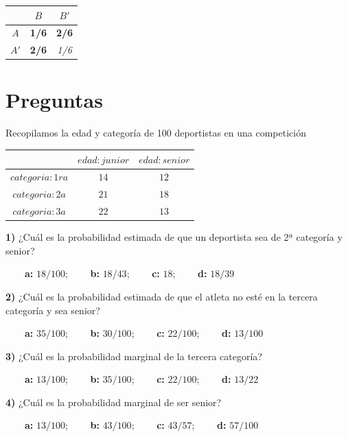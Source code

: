 \documentclass[
]{book}
\begin{document}
\begin{longtable}[]{@{}ccc@{}}
\toprule\noalign{}
& \(B\) & \(B'\) \\
\midrule\noalign{}
\endhead
\bottomrule\noalign{}
\endlastfoot
\(A\) & \textbf{1/6} & \textbf{2/6} \\
\(A'\) & \textbf{2/6} & \emph{1/6} \\
\end{longtable}

\hypertarget{preguntas-1}{%
\section{Preguntas}\label{preguntas-1}}

Recopilamos la edad y categoría de 100 deportistas en una competición

\begin{longtable}[]{@{}ccc@{}}
\toprule\noalign{}
& \(edad:junior\) & \(edad:senior\) \\
\midrule\noalign{}
\endhead
\bottomrule\noalign{}
\endlastfoot
\(categoria:1ra\) & \(14\) & \(12\) \\
\(categoria:2a\) & \(21\) & \(18\) \\
\(categoria:3a\) & \(22\) & \(13\) \\
\end{longtable}

\textbf{1)} ¿Cuál es la probabilidad estimada de que un deportista sea de 2ª categoría y senior?

\textbf{\(\qquad\)a:} \(18/100\); \textbf{\(\qquad\)b:} \(18/43\); \textbf{\(\qquad\)c:} \(18\); \textbf{\(\qquad\)d:} \(18/39\)

\textbf{2)} ¿Cuál es la probabilidad estimada de que el atleta no esté en la tercera categoría y sea senior?

\textbf{\(\qquad\)a:} \(35/100\); \textbf{\(\qquad\)b:} \(30/100\); \textbf{\(\qquad\)c:} \(22/100\); \textbf{\(\qquad\)d:} \(13/100\)

\textbf{3)} ¿Cuál es la probabilidad marginal de la tercera categoría?

\textbf{\(\qquad\)a:} \(13/100\); \textbf{\(\qquad\)b:} \(35/100\); \textbf{\(\qquad\)c:} \(22/100\); \textbf{\(\qquad\)d:} \(13/22\)

\textbf{4)} ¿Cuál es la probabilidad marginal de ser senior?

\textbf{\(\qquad\)a:} \(13/100\); \textbf{\(\qquad\)b:} \(43/100\); \textbf{\(\qquad\)c:} \(43/57\); \textbf{\(\qquad\)d:} \(57/100\)
\end{document}
